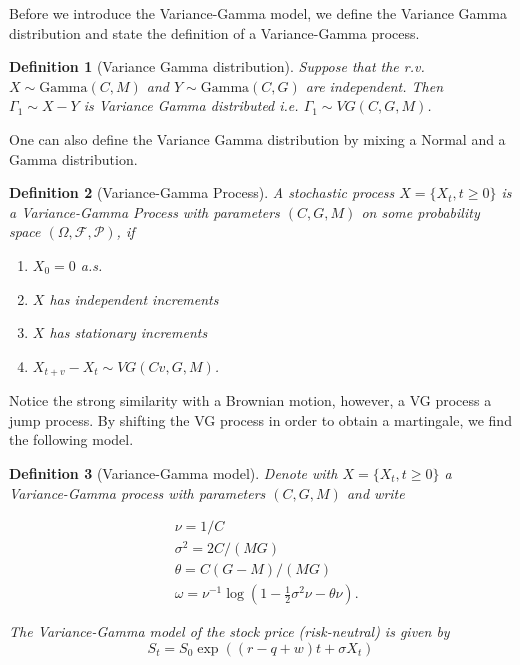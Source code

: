 \documentclass[12pt,a4paper,oneside]{book}
\newtheorem{Definition}{Definition}
\begin{document}
Before we introduce the Variance-Gamma model, we define the Variance Gamma distribution and state the definition of a Variance-Gamma process.

\begin{Definition}[Variance Gamma distribution]
Suppose that the r.v. $X \sim \text{Gamma}(C,M)$ and $Y \sim \text{Gamma}(C,G)$ are independent. Then $\Gamma_1 \sim X-Y$ is Variance Gamma distributed i.e.  $\Gamma_1 \sim VG(C,G,M)$. 
\end{Definition}

One can also define the Variance Gamma distribution by
mixing a Normal and a Gamma distribution. 

\begin{Definition}[Variance-Gamma Process]
A stochastic process $X = \{ X_t, t \geq 0 \}$ is a Variance-Gamma Process with parameters $(C,G,M)$ on some probability space $(\Omega,\mathcal{F}, \mathcal{P})$, if

\begin{enumerate}
    \item $X_0 = 0$ a.s.
    \item $X$ has independent increments
    \item $X$ has stationary increments
    \item $X_{t+v} - X_t \sim VG(Cv,G,M)$.
\end{enumerate}
\end{Definition}

Notice the strong similarity with a Brownian motion, however, a VG process a jump process. By shifting the VG process in order to obtain a martingale, we find the following model. 


\begin{Definition}[Variance-Gamma model]
Denote with $X = \{X_t, t \geq 0 \}$  a Variance-Gamma process with parameters $(C,G,M)$ and write  

\begin{align*}
&\nu = 1/C \\ 
&\sigma^2 = 2C/(MG) \\ 
&\theta = C(G-M)/(MG) \\
&\omega = \nu^{-1} \log(1- \frac{1}{2} \sigma^2 \nu  - \theta \nu).
\end{align*}

The Variance-Gamma model of the stock price (risk-neutral) is given by
\begin{equation}
S_t = S_0 \exp \left( \left(r-q+w \right) t + \sigma X_t \right)
\end{equation}
\end{Definition}
\end{document}
